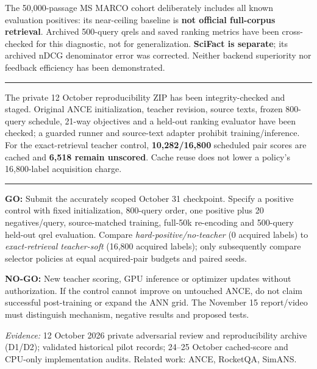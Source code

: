 \documentclass[10pt]{article}
\newcommand{\sect}[1]{\vspace{5pt}{\large\bfseries #1}\par\vspace{3pt}\hrule\vspace{6pt}}
\begin{document}
The 50,000-passage MS MARCO cohort deliberately includes all known evaluation positives: its near-ceiling baseline is \textbf{not official full-corpus retrieval}. Archived 500-query qrels and saved ranking metrics have been cross-checked for this diagnostic, not for generalization. \textbf{SciFact is separate}; its archived nDCG denominator error was corrected. Neither backend superiority nor feedback efficiency has been demonstrated.

\sect{What is ready; what remains}
The private 12 October reproducibility ZIP has been integrity-checked and staged. Original ANCE initialization, teacher revision, source texts, frozen 800-query schedule, 21-way objectives and a held-out ranking evaluator have been checked; a guarded runner and source-text adapter prohibit training/inference. For the exact-retrieval teacher control, \textbf{10,282/16,800} scheduled pair scores are cached and \textbf{6,518 remain unscored}. Cache reuse does not lower a policy's 16,800-label acquisition charge.

\sect{Decision and November 15 experiment gate}
\textbf{GO:} Submit the accurately scoped October 31 checkpoint. Specify a positive control with fixed initialization, 800-query order, one positive plus 20 negatives/query, source-matched training, full-50k re-encoding and 500-query held-out qrel evaluation. Compare \emph{hard-positive/no-teacher} (0 acquired labels) to \emph{exact-retrieval teacher-soft} (16,800 acquired labels); only subsequently compare selector policies at equal acquired-pair budgets and paired seeds.

\textbf{NO-GO:} New teacher scoring, GPU inference or optimizer updates without authorization. If the control cannot improve on untouched ANCE, do not claim successful post-training or expand the ANN grid. The November 15 report/video must distinguish mechanism, negative results and proposed tests.

{\footnotesize\emph{Evidence:} 12 October 2026 private adversarial review and reproducibility archive (D1/D2); validated historical pilot records; 24--25 October cached-score and CPU-only implementation audits. Related work: ANCE, RocketQA, SimANS.}
\end{document}
